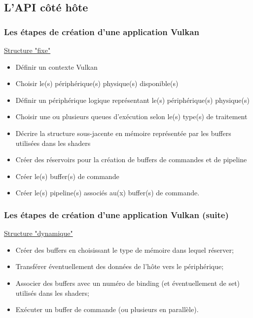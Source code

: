 \documentclass{beamer}
\begin{document}
\subsection{L'API côté hôte}

\begin{frame}[fragile]
\frametitle{Les étapes de création d'une application Vulkan}

\underline{Structure "fixe"}
\begin{itemize}
\item Définir un contexte Vulkan
\item Choisir le(s) périphérique(s) physique(s) disponible(s)
\item Définir un périphérique logique représentant le(s) périphérique(s) physique(s)
\item Choisir une ou plusieurs queues d'exécution selon le(s) type(s) de traitement
\item Décrire la structure sous-jacente en mémoire représentée par les buffers utilisées dans les shaders
\item Créer des réservoirs pour la création de buffers de commandes et de pipeline 
\item Créer le(s) buffer(s) de commande
\item Créer le(s) pipeline(s) associés au(x) buffer(s) de commande.
\end{itemize}
\end{frame}

\begin{frame}[fragile]
\frametitle{Les étapes de création d'une application Vulkan (suite)}

\underline{Structure "dynamique"}
\begin{itemize}
\item Créer des buffers en choisissant le type de mémoire dans lequel réserver;
\item Transférer éventuellement des données de l'hôte vers le périphérique;
\item Associer des buffers avec un numéro de binding (et éventuellement de set) utilisés dans les shaders;
\item Exécuter un buffer de commande (ou plusieurs en parallèle).
\end{itemize}
\end{frame}
\end{document}
